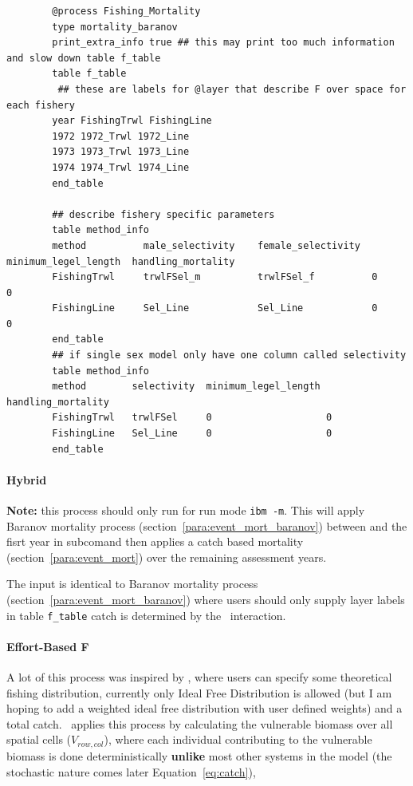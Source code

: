 \pagebreak
{\small{\begin{verbatim}
		@process Fishing_Mortality
		type mortality_baranov
		print_extra_info true ## this may print too much information and slow down table f_table
		table f_table
		 ## these are labels for @layer that describe F over space for each fishery
		year FishingTrwl FishingLine
		1972 1972_Trwl 1972_Line
		1973 1973_Trwl 1973_Line
		1974 1974_Trwl 1974_Line
		end_table
		
		## describe fishery specific parameters		
		table method_info
		method          male_selectivity    female_selectivity 	minimum_legel_length  handling_mortality
		FishingTrwl     trwlFSel_m          trwlFSel_f			0			0
		FishingLine	    Sel_Line            Sel_Line			0			0
		end_table
		## if single sex model only have one column called selectivity
		table method_info
		method        selectivity  minimum_legel_length handling_mortality
		FishingTrwl   trwlFSel     0                    0
		FishingLine   Sel_Line     0                    0
		end_table
		\end{verbatim}}}


\paragraph{Hybrid}\label{para:baranov_Hybrid}
\textbf{Note:} this process should only run for run mode \texttt{ibm -m}. This will apply Baranov mortality process (section~\ref{para:event_mort_baranov}) between  and the fisrt year in  subcomand then applies a catch based mortality  (section~\ref{para:event_mort}) over the remaining assessment years.

The input is identical to Baranov mortality process (section~\ref{para:event_mort_baranov}) where users should only supply layer labels in table \texttt{f\_table} catch is determined by the \R\ interaction.
\paragraph{Effort-Based F}\label{para:effort_based_F}
A lot of this process was inspired by \cite{truesdell2017effects}, where users can specify some theoretical fishing distribution, currently only Ideal Free Distribution is allowed (but I am hoping to add a weighted ideal free distribution with user defined weights) and a total catch. \IBM\ applies this process by calculating the vulnerable biomass over all spatial cells ($V_{row,col}$), where each individual contributing to the vulnerable biomass is done deterministically \textbf{unlike} most other systems in the model (the stochastic nature comes later Equation~\ref{eq:catch}),

